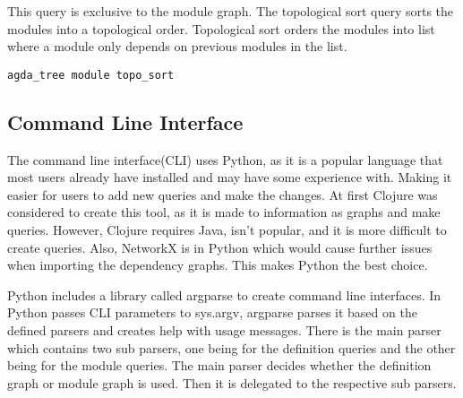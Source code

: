This query is exclusive to the module graph. The topological sort query sorts
the modules into a topological order. Topological sort orders the modules into
list where a module only depends on previous modules in the list.


\begin{lstlisting}
agda_tree module topo_sort
\end{lstlisting}


\subsection{Command Line Interface}\label{sub:Agda Tree CLI}


The command line interface(CLI) uses Python, as it is a popular language that
most users already have installed and may have some experience with. Making it
easier for users to add new queries and make the changes. At first Clojure was
considered to create this tool, as it is made to information as graphs and make
queries. However, Clojure requires Java, isn't popular, and it is more difficult
to create queries. Also, NetworkX is in Python which would cause further issues
when importing the dependency graphs. This makes Python the best choice.

Python includes a library called argparse to create command line interfaces. In
Python passes CLI parameters to sys.argv, argparse parses it based on the
defined parsers and creates help with usage messages. There is the main parser
which contains two sub parsers, one being for the definition queries and the
other being for the module queries. The main parser decides whether the
definition graph or module graph is used. Then it is delegated to the
respective sub parsers.

